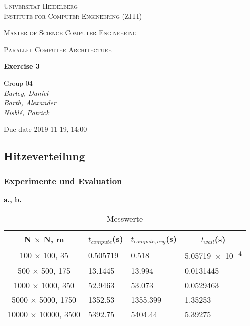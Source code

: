\documentclass[12pt]{article}
\newcommand{\lecture}{Parallel Computer Architecture}
\newcommand{\exercise}{Exercise 3}
\newcommand{\groupnumber}{Group 04}
\newcommand{\groupmemberslist}{Barley, Daniel\\Barth, Alexander\\Nisblé, Patrick}
\newcommand{\duedate}{2019-11-19, 14:00}
\begin{document}
	\begin{titlepage}
		\centering
		
		{\scshape\LARGE Universität Heidelberg\\Institute for Computer Engineering (ZITI) \par}
		\vspace{1.5cm}
		{\scshape\Large Master of Science Computer Engineering \par}
		\vspace{0.5cm}
		{\scshape\Large \lecture \par}
		\vspace{1.5cm}
		{\huge\bfseries \exercise \par}
		\vspace{2cm}
		{\Large \groupnumber \itshape  \\ \groupmemberslist \par}
		\vfill
		
		
		{\large Due date \duedate \par}
	\end{titlepage}
\setcounter{section}{3}
\subsection{Hitzeverteilung}

\setcounter{subsubsection}{1}

\subsubsection{Experimente und Evaluation}

\noindent \textbf{a., b.}

\begin{table}[ht]
	\centering
	\caption[Messwerte]{Messwerte}
	\begin{tabular}{c|l|l|l}
		\hline
		\cellcolor{gray!40}\textbf{N $\times$ N, m} & \multicolumn{1}{c}{\cellcolor{gray!40}\textbf{$t_{compute}$(\si{\second})}} &
		\multicolumn{1}{c}{\cellcolor{gray!40}\textbf{$t_{compute,avg}$(\si{\second})}} & \multicolumn{1}{c}{\cellcolor{gray!40}\textbf{$t_{wall}$(\si{\second})}}\\
		\hline\hline
		100 $\times$ 100, 35 & 0.505719 & 0.518 & \num{5.05719e-4} \\\hline
		500 $\times$ 500, 175 & 13.1445 & 13.994 & 0.0131445 \\\hline
		1000 $\times$ 1000, 350 & 52.9463 & 53.073 & 0.0529463\\\hline
		5000 $\times$ 5000, 1750 & 1352.53 & 1355.399 & 1.35253\\\hline
		10000 $\times$ 10000, 3500 & 5392.75 & 5404.44 & 5.39275\\\hline
	\end{tabular}
	\label{tab:values}
\end{table}
\end{document}
